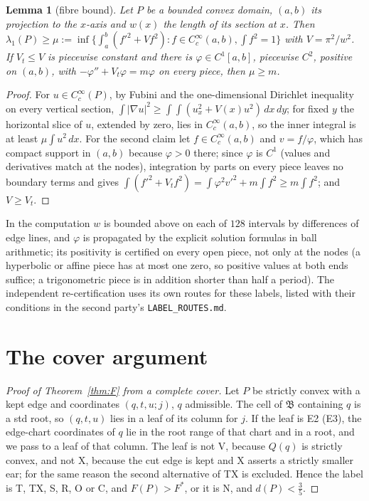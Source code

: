 \documentclass[11pt]{article}
\newtheorem{lemma}[theorem]{Lemma}
\theoremstyle{remark}
\begin{document}
\begin{lemma}[fibre bound]\label{lem:OD}
Let $P$ be a bounded convex domain, $(a,b)$ its projection to the $x$-axis and $w(x)$ the length of its section at
$x$. Then $\lambda_1(P)\ge\mu:=\inf\{\int_a^b(f'^2+Vf^2):f\in C_c^\infty(a,b),\int f^2=1\}$ with $V=\pi^2/w^2$. If $V_t\le V$
is piecewise constant and there is $\varphi\in C^1[a,b]$, piecewise $C^2$, positive on $(a,b)$, with
$-\varphi''+V_t\varphi=m\varphi$ on every piece, then $\mu\ge m$.
\end{lemma}
\begin{proof}
For $u\in C_c^\infty(P)$, by Fubini and the one-dimensional Dirichlet inequality on every vertical section,
$\int|\nabla u|^2\ge\int\!\!\int(u_x^2+V(x)u^2)\,dx\,dy$; for fixed $y$ the horizontal slice of $u$, extended by zero,
lies in $C_c^\infty(a,b)$, so the inner integral is at least $\mu\int u^2\,dx$. For the second claim let $f\in
C_c^\infty(a,b)$ and $v=f/\varphi$, which has compact support in $(a,b)$ because $\varphi>0$ there; since $\varphi$ is
$C^1$ (values and derivatives match at the nodes), integration by parts on every piece leaves no boundary terms and
gives $\int(f'^2+V_tf^2)=\int\varphi^2v'^2+m\int f^2\ge m\int f^2$; and $V\ge V_t$.
\end{proof}
In the computation $w$ is bounded above on each of $128$ intervals by differences of edge lines, and $\varphi$ is
propagated by the explicit solution formulas in ball arithmetic; its positivity is certified on every open piece, not
only at the nodes (a hyperbolic or affine piece has at most one zero, so positive values at both ends suffice; a
trigonometric piece is in addition shorter than half a period). The independent re-certification uses its own routes
for these labels, listed with their conditions in the second party's \texttt{LABEL\_ROUTES.md}.

\section{The cover argument}\label{sec:cover}
\begin{proof}[Proof of Theorem~\ref{thm:F} from a complete cover]
Let $P$ be strictly convex with a kept edge and coordinates $(q,t,u;j)$, $q$ admissible. The cell of $\mathfrak B$
containing $q$ is a std root, so $(q,t,u)$ lies in a leaf of its column for $j$. If the leaf is E2 (E3), the edge-chart
coordinates of $q$ lie in the root range of that chart and in a root, and we pass to a leaf of that column. The leaf is
not V, because $Q(q)$ is strictly convex, and not X, because the cut edge is kept and X asserts a strictly smaller ear;
for the same reason the second alternative of TX is excluded. Hence the label is T, TX, S, R, O or C, and $F(P)>F^*$,
or it is N, and $d(P)<\frac35$.
\end{proof}
\end{document}
